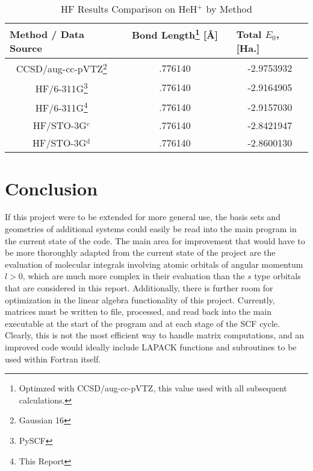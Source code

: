 \documentclass[%
 aip,
 amsmath,amssymb,
 reprint,%
]{revtex4-1}
\begin{document}
\begin{table}[]
\caption{HF Results Comparison on HeH$^{+}$ by Method}
\label{tab:hf_results}
\begin{ruledtabular}
\begin{tabular}{|c|c|c|}
\hline
\multicolumn{1}{|l|}{\textbf{Method / Data Source}} &
\multicolumn{1}{c|}{\textbf{Bond Length\footnote{Optimzed with
CCSD/aug-cc-pVTZ, this value used with all subsequent calculations.} [Å] \ \ \ \ }} 
& \multicolumn{1}{l|}{\textbf{Total $E_0$, [Ha.]}} \\ \hline
CCSD/aug-cc-pVTZ\footnote{Gaussian 16}      & .776140  & -2.9753932    \\ \hline 
HF/6-311G\footnote{PySCF}     & .776140     & -2.9164905    \\ \hline
HF/6-311G\footnote{This Report}  & .776140  &  -2.9157030         \\ \hline
HF/STO-3G$^{\text{c}}$ & .776140 & -2.8421947 \\ \hline
HF/STO-3G$^{\text{d}}$ & .776140 &  -2.8600130 \\ \hline
\end{tabular}
\end{ruledtabular}
\end{table}


\section{Conclusion}
If this project were to be extended for more general use, the basis sets and
geometries of additional systems could easily be read into the main program in
the current state of the code.  The main area
for improvement that would have to be more thoroughly adapted
from the current state of the project are the evaluation of molecular
integrals involving atomic orbitals of angular momentum $l > 0$, which are
much more complex in their evaluation than the $s$ type orbitals that are
considered in this report. Additionally, there is further room for
optimization in the linear algebra functionality of this project. Currently,
matrices must be written to file, processed, and read back into the main
executable at the start of the program and at each stage of the SCF cycle.
Clearly, this is not the most efficient way to handle matrix computations, and
an improved code would ideally include LAPACK functions and subroutines to be
used within Fortran itself.


\end{document}
